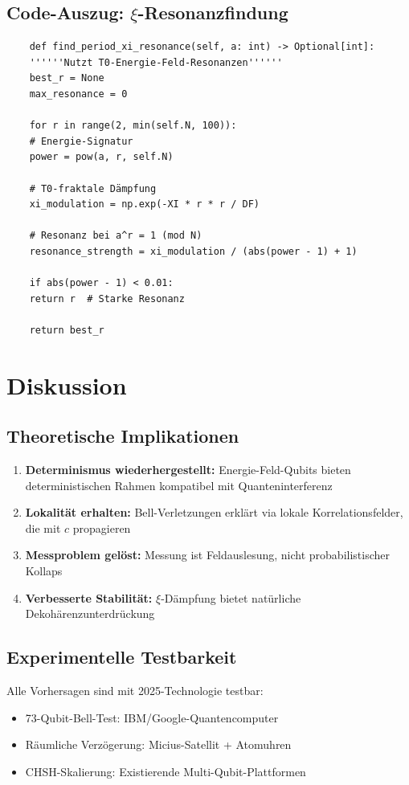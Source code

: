 \subsection{Code-Auszug: $\xi$-Resonanzfindung}

\begin{lstlisting}
	def find_period_xi_resonance(self, a: int) -> Optional[int]:
	''''''Nutzt T0-Energie-Feld-Resonanzen''''''
	best_r = None
	max_resonance = 0
	
	for r in range(2, min(self.N, 100)):
	# Energie-Signatur
	power = pow(a, r, self.N)
	
	# T0-fraktale Dämpfung
	xi_modulation = np.exp(-XI * r * r / DF)
	
	# Resonanz bei a^r = 1 (mod N)
	resonance_strength = xi_modulation / (abs(power - 1) + 1)
	
	if abs(power - 1) < 0.01:
	return r  # Starke Resonanz
	
	return best_r
\end{lstlisting}

\section{Diskussion}

\subsection{Theoretische Implikationen}

\begin{enumerate}
	\item \textbf{Determinismus wiederhergestellt:} Energie-Feld-Qubits bieten deterministischen Rahmen kompatibel mit Quanteninterferenz
	\item \textbf{Lokalität erhalten:} Bell-Verletzungen erklärt via lokale Korrelationsfelder, die mit $c$ propagieren
	\item \textbf{Messproblem gelöst:} Messung ist Feldauslesung, nicht probabilistischer Kollaps
	\item \textbf{Verbesserte Stabilität:} $\xi$-Dämpfung bietet natürliche Dekohärenzunterdrückung
\end{enumerate}

\subsection{Experimentelle Testbarkeit}

Alle Vorhersagen sind mit 2025-Technologie testbar:
\begin{itemize}
	\item 73-Qubit-Bell-Test: IBM/Google-Quantencomputer
	\item Räumliche Verzögerung: Micius-Satellit + Atomuhren
	\item CHSH-Skalierung: Existierende Multi-Qubit-Plattformen
\end{itemize}

